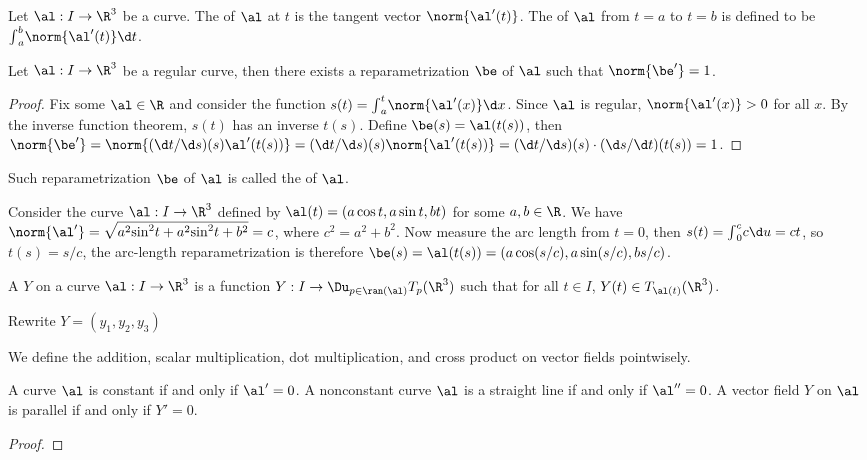 \documentclass[10pt]{article}
\begin{document}
\begin{definition}
    Let $\al:I\to{\R}^{3}$ be a curve. The  of $\al$ at $t$ is the tangent vector $\norm{\al'(t)}$. The  of $\al$ from $t=a$ to $t=b$ is defined to be ${\int}_{a}^{b}\norm{\al'(t)}\d t$.
\end{definition}
\begin{proposition}
    Let $\al:I\to{\R}^{3}$ be a regular curve, then there exists a reparametrization $\be$ of $\al$ such that $\norm{\be'}=1$.
\end{proposition}
\begin{proof}
    Fix some $\al\in\R$ and consider the function $s(t)={\int}_{a}^{t}\norm{\al'(x)}\d x$. Since $\al$ is regular, $\norm{\al'(x)}>0$ for all $x$. By the inverse function theorem, $s(t)$ has an inverse $t(s)$. Define $\be(s)=\al(t(s))$, then $\norm{\be'}=\norm{(\d t/\d s)(s)\al'(t(s))}=(\d t/\d s)(s)\norm{\al'(t(s))}=(\d t/\d s)(s)\cdot(\d s/\d t)(t(s))=1$.
\end{proof}
\par
Such reparametrization $\be$ of $\al$ is called the  of $\al$.
\begin{example}
    Consider the curve $\al:I\to{\R}^{3}$ defined by $\al(t)=(a\cos t,a\sin t,bt)$ for some $a,b\in\R$. We have $\norm{\al'}=\sqrt{{a}^{2}{\sin}^{2}t+{a}^{2}{\sin}^{2}t+{b}^{2}}=c$, where ${c}^{2}={a}^{2}+{b}^{2}$. Now measure the arc length from $t=0$, then $s(t)={\int}_{0}^{c}c\d u=ct$, so $t(s)=s/c$, the arc-length reparametrization is therefore $\be(s)=\al(t(s))=(a\cos(s/c),a\sin(s/c),bs/c)$.
\end{example}
\begin{definition}
    A  $Y$ on a curve $\al:I\to{\R}^{3}$ is a function $Y:I\to{\Du}_{p\in\ran(\al)}{T}_{p}({\R}^{3})$ such that for all $t\in I$, $Y(t)\in{T}_{\al(t)}({\R}^{3})$.
\end{definition}
\par
Rewrite $Y=({y}_{1},{y}_{2},{y}_{3})$

We define the addition, scalar multiplication, dot multiplication, and cross product on vector fields pointwisely.


\begin{definition}
    
\end{definition}
\begin{proposition}
    A curve $\al$ is constant if and only if $\al'=0$. A nonconstant curve $\al$ is a straight line if and only if $\al''=0$. A vector field $Y$ on $\al$ is parallel if and only if $Y'=0$.
\end{proposition}
\begin{proof}

\end{proof}


\hindex
\end{document}
